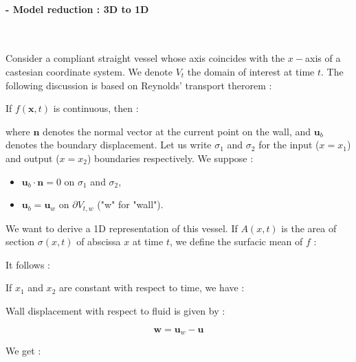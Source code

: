 \documentclass[a4paper]{article}
\begin{document}

\paragraph{ - Model reduction : 3D to 1D}~


Consider a compliant straight vessel whose axis coincides with the $x-$axis of a castesian coordinate system. We denote $V_t$ the domain of interest at time $t$. The following discussion is based on Reynolds' transport therorem :

\thm If $f(\mathbf x,t)$ is continuous, then :

where $\mathbf n$ denotes the normal vector at the current point on the wall, and $\mathbf u_b$ denotes the boundary displacement. Let us write $\sigma_1$ and $\sigma_2$ for the input ($x=x_1$) and output ($x=x_2$) boundaries respectively. We suppose :
\begin{itemize}
\item $\mathbf u_b\cdot\mathbf n=0$ on $\sigma_1$ and $\sigma_2$,
\item $\mathbf u_b=\mathbf u_w$ on $\partial V_{t,w}$ ("w" for "wall").
\end{itemize}

We want to derive a 1D representation of this vessel. If $A(x,t)$ is the area of section $\sigma(x,t)$ of abscissa $x$ at time $t$, we define the surfacic mean of $f$ :


\noindent It follows :


\noindent If $x_1$ and $x_2$ are constant with respect to time, we have :


\noindent Wall displacement with respect to fluid is given by :

$$\mathbf w=\mathbf u_w-\mathbf u$$

\noindent We get :

\end{document}
